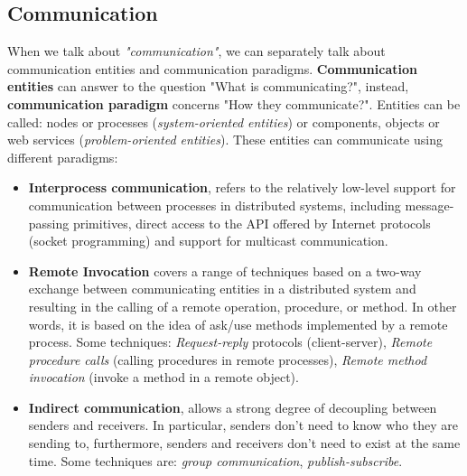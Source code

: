 \documentclass[11pt,a4paper]{article}
\begin{document}
\subsection{Communication}
When we talk about \textit{"communication"}, we can separately talk about communication entities and communication paradigms. \textbf{Communication entities} can answer to the question "What is communicating?", instead, \textbf{communication paradigm} concerns "How they communicate?". Entities can be called: nodes or processes (\textit{system-oriented entities}) or components, objects or web services (\textit{problem-oriented entities}).
These entities can communicate using different paradigms: 
\begin{itemize}
    \item \textbf{Interprocess communication}, refers to the relatively low-level support for communication between processes in distributed systems, including message-passing primitives, direct access to the API offered by Internet protocols (socket programming) and support for multicast communication.
    \item \textbf{Remote Invocation} covers a range of techniques based on a two-way exchange between communicating entities in a distributed system and resulting in the calling of a remote operation, procedure, or method. In other words, it is based on the idea of ask/use methods implemented by a remote process. Some techniques: \textit{Request-reply} protocols (client-server), \textit{Remote procedure calls} (calling procedures in remote processes), \textit{Remote method invocation} (invoke a method in a remote object).
    \item \textbf{Indirect communication}, allows a strong degree of decoupling between senders and receivers. In particular, senders don't need to know who they are sending to, furthermore, senders and receivers don't need to exist at the same time. Some techniques are: \textit{group communication}, \textit{publish-subscribe}.
\end{itemize}
\end{document}
